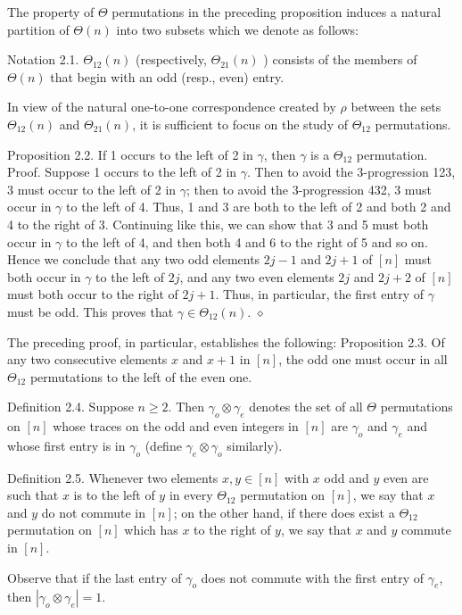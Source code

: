\documentclass[10pt]{article}
\newcommand{\proofend}{\hfill\(\diamond\)}
\begin{document}
The property of $\Theta$ permutations in the preceding proposition induces a natural partition of $\Theta(n)$ into two subsets which we denote as follows:

Notation 2.1. $\Theta_{12}(n)$ (respectively, $\Theta_{21}(n)$ ) consists of the members of $\Theta(n)$ that begin with an odd (resp., even) entry.

In view of the natural one-to-one correspondence created by $\rho$ between the sets $\Theta_{12}(n)$ and $\Theta_{21}(n)$, it is sufficient to focus on the study of $\Theta_{12}$ permutations.

Proposition 2.2. If 1 occurs to the left of 2 in $\gamma$, then $\gamma$ is a $\Theta_{12}$ permutation.\\
Proof. Suppose 1 occurs to the left of 2 in $\gamma$. Then to avoid the 3-progression 123, 3 must occur to the left of 2 in $\gamma$; then to avoid the 3-progression 432, 3 must occur in $\gamma$ to the left of 4. Thus, 1 and 3 are both to the left of 2 and both 2 and 4 to the right of 3. Continuing like this, we can show that 3 and 5 must both occur in $\gamma$ to the left of 4, and then both 4 and 6 to the right of 5 and so on. Hence we conclude that any two odd elements $2 j-1$ and $2 j+1$ of $[n]$ must both occur in $\gamma$ to the left of $2 j$, and any two even elements $2 j$ and $2 j+2$ of $[n]$ must both occur to the right of $2 j+1$. Thus, in particular, the first entry of $\gamma$ must be odd. This proves that $\gamma \in \Theta_{12}(n)$. \proofend

The preceding proof, in particular, establishes the following:
Proposition 2.3. Of any two consecutive elements $x$ and $x+1$ in $[n]$, the odd one must occur in all $\Theta_{12}$ permutations to the left of the even one.

Definition 2.4. Suppose $n \geq 2$. Then $\gamma_{o} \otimes \gamma_{e}$ denotes the set of all $\Theta$ permutations on $[n]$ whose traces on the odd and even integers in $[n]$ are $\gamma_{o}$ and $\gamma_{e}$ and whose first entry is in $\gamma_{o}$ (define $\gamma_{e} \otimes \gamma_{o}$ similarly).

Definition 2.5. Whenever two elements $x, y \in[n]$ with $x$ odd and $y$ even are such that $x$ is to the left of $y$ in every $\Theta_{12}$ permutation on $[n]$, we say that $x$ and $y$ do not commute in $[n]$; on the other hand, if there does exist a $\Theta_{12}$ permutation on $[n]$ which has $x$ to the right of $y$, we say that $x$ and $y$ commute in $[n]$.

Observe that if the last entry of $\gamma_{o}$ does not commute with the first entry of $\gamma_{e}$, then $\left|\gamma_{o} \otimes \gamma_{e}\right|=1$.
\end{document}
